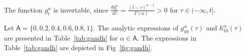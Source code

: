 \documentclass[twoside,reqno,11pt]{fcaa-var} %
\begin{document}
The function $g_t^{\alpha}$ is invertable, since $\frac{d g_t^{\alpha}}{d\tau}=\frac{(t-\tau)^{\alpha-1}}{\Gamma(\alpha)} > 0$ for $\tau\in(-\infty,t]$.




\noindent
Let $\mathsf{A} = \{0,0.2,0.4,0.6,0.8,1\}$. The analytic expressions of $g_{10}^{\alpha}(\tau)$ and $h_{10}^{\alpha}(\tau)$ are presented in Table~\ref{tab:gandh} for $\alpha\in\mathsf{A}$. 
The expressions in Table~\ref{tab:gandh} are depicted in Fig~\ref{fig:gandh}.
\end{document}
